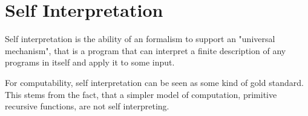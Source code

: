 \section{Self Interpretation}
\label{sec:self}
Self interpretation is the ability of an formalism to support an
"universal mechanism", that is a program that can interpret a finite
description of any programs in itself and apply it to some input.

For computability, self interpretation can be seen as some kind of gold
standard\citationneeded. This stems from the fact, that a simpler model of
computation, primitive recursive functions, are not self interpreting.
